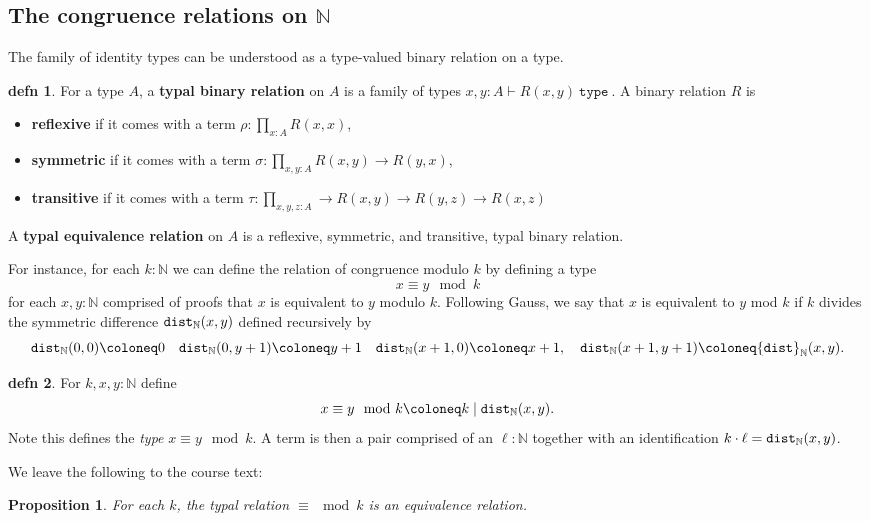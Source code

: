 \documentclass{amsart}
\theoremstyle{theorem}
\newtheorem*{prop}{Proposition}
\theoremstyle{definition}
\newtheorem*{defn}{defn}
\theoremstyle{remark}
\newcommand{\0}{\mathbbe{0}}
\newcommand{\1}{\mathbbe{1}}
\newcommand{\2}{\mathbbe{2}}
\newcommand{\3}{\mathbbe{3}}
\newcommand{\4}{\mathbbe{4}}
\newcommand{\univ}{{~\texttt{type}~}}
\newcommand{\term}[1]{{\textup{\texttt{#1}}}}
\newcommand{\bN}{{\mathbb{N}}}
\begin{document}
\subsection*{The congruence relations on \texorpdfstring{$\bN$}{N}}

The family of identity types can be understood as a type-valued binary relation on a type.

\begin{defn} For a type $A$, a \textbf{typal binary relation} on $A$ is a family of types $x, y : A \vdash R(x,y) \univ$. A binary relation $R$ is 
\begin{itemize}
\item \textbf{reflexive} if it comes with a term $\rho : \prod_{x :A} R(x,x)$,
\item \textbf{symmetric} if it comes with a term $\sigma : \prod_{x,y :A} R(x,y) \to R(y,x)$,
\item \textbf{transitive} if it comes with a term $\tau : \prod_{x,y,z : A} \to R(x,y) \to R(y,z) \to R(x,z)$
\end{itemize}
A \textbf{typal equivalence relation} on $A$ is a reflexive, symmetric, and transitive, typal binary relation.
\end{defn}

For instance, for each $k : \bN$ we can define the relation of congruence modulo $k$ by defining a type
\[ x \equiv y \mod k\]
for each $x,y : \bN$ comprised of proofs that $x$ is equivalent to $y$ modulo $k$. Following Gauss, we say that $x$ is equivalent to $y$ mod $k$ if $k$ divides the symmetric difference $\term{dist}_\bN(x,y)$ defined recursively by
\[ \term{dist}_\bN(0,0) \coloneq 0 \quad \term{dist}_\bN(0, y+1) \coloneq y+1 \quad \term{dist}_\bN(x+1,0) \coloneq x+1, \quad \term{dist}_\bN(x+1,y+1) \coloneq \term{dist}_\bN(x,y).\]

\begin{defn} For $k,x,y : \bN$ define
\[ x \equiv y \mod k \coloneq k \mid \term{dist}_\bN(x,y).\]
Note this defines the \emph{type} $x \equiv y \mod k$. A term is then a pair comprised of an $\ell : \bN$ together with an identification $k \cdot \ell = \term{dist}_\bN(x,y)$.
\end{defn}

We leave the following to the course text:

\begin{prop} For each $k$, the typal relation $\equiv \mod k$ is an equivalence relation.
\end{prop}
\end{document}
